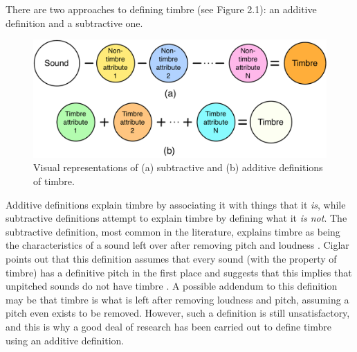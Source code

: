 \documentclass[12pt]{report} 	%
\numberwithin{figure}{chapter}
\numberwithin{table}{chapter}
\numberwithin{equation}{chapter}
\begin{document}
\begin{flushleft}
There are two approaches to defining timbre (see Figure 2.1): an additive definition and a subtractive one. 
\begin{figure}[!htp]
\begin{center}
\includegraphics[scale=0.45]{SubtractiveVsAdditive}
\caption[Subtractive vs. additive timbre definitions]{Visual representations of (a) subtractive and (b) additive definitions of timbre.}
\end{center}
\end{figure}
Additive definitions explain timbre by associating it with things that it \textit{is}, while subtractive definitions attempt to explain timbre by defining what it \textit{is not}. The subtractive definition, most common in the literature, explains timbre as being the characteristics of a sound left over after removing pitch and loudness \cite[p. 45]{Wessel:1979tg} \cite[p. 225]{Toiviainen:1998hs}. Ciglar points out that this definition assumes that every sound (with the property of timbre) has a definitive pitch in the first place and suggests that this implies that unpitched sounds do not have timbre \cite[p. 7]{Ciglar:2009uf}. A possible addendum to this definition may be that timbre is what is left after removing loudness and pitch, assuming a pitch even exists to be removed. However, such a definition is still unsatisfactory, and this is why a good deal of research has been carried out to define timbre using an additive definition.


\end{flushleft}
\end{document}
